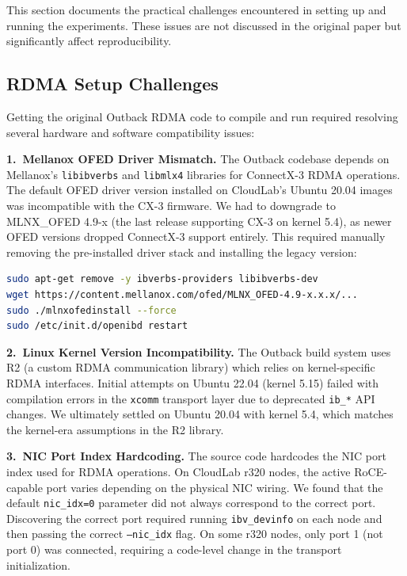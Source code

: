 \documentclass[conference]{IEEEtran}
\begin{document}
This section documents the practical challenges encountered in setting up and running the experiments. These issues are not discussed in the original paper but significantly affect reproducibility.

\subsection{RDMA Setup Challenges}

Getting the original Outback RDMA code to compile and run required resolving several hardware and software compatibility issues:

\textbf{1.\ Mellanox OFED Driver Mismatch.}
The Outback codebase depends on Mellanox's \texttt{libibverbs} and \texttt{libmlx4} libraries for ConnectX-3 RDMA operations. The default OFED driver version installed on CloudLab's Ubuntu 20.04 images was incompatible with the CX-3 firmware. We had to downgrade to MLNX\_OFED 4.9-x (the last release supporting CX-3 on kernel 5.4), as newer OFED versions dropped ConnectX-3 support entirely. This required manually removing the pre-installed driver stack and installing the legacy version:
\begin{lstlisting}[language=bash]
sudo apt-get remove -y ibverbs-providers libibverbs-dev
wget https://content.mellanox.com/ofed/MLNX_OFED-4.9-x.x.x/...
sudo ./mlnxofedinstall --force
sudo /etc/init.d/openibd restart
\end{lstlisting}

\textbf{2.\ Linux Kernel Version Incompatibility.}
The Outback build system uses R2 (a custom RDMA communication library) which relies on kernel-specific RDMA interfaces. Initial attempts on Ubuntu 22.04 (kernel 5.15) failed with compilation errors in the \texttt{xcomm} transport layer due to deprecated \texttt{ib\_*} API changes. We ultimately settled on Ubuntu 20.04 with kernel 5.4, which matches the kernel-era assumptions in the R2 library.

\textbf{3.\ NIC Port Index Hardcoding.}
The source code hardcodes the NIC port index used for RDMA operations. On CloudLab r320 nodes, the active RoCE-capable port varies depending on the physical NIC wiring. We found that the default \texttt{nic\_idx=0} parameter did not always correspond to the correct port. Discovering the correct port required running \texttt{ibv\_devinfo} on each node and then passing the correct \texttt{--nic\_idx} flag. On some r320 nodes, only port 1 (not port 0) was connected, requiring a code-level change in the transport initialization.
\end{document}
